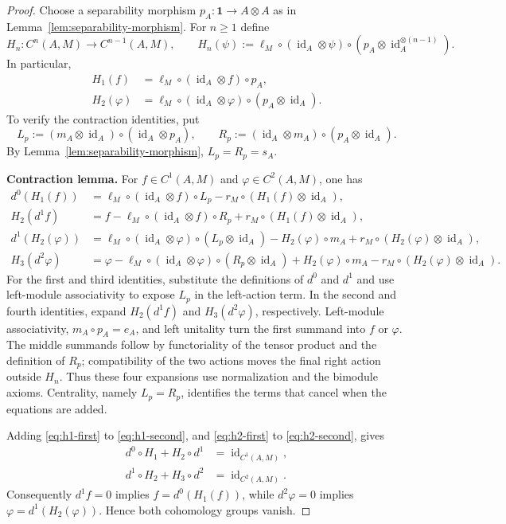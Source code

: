 \documentclass[11pt]{amsart}
\theoremstyle{definition}
\theoremstyle{remark}
\newcommand{\one}{\mathbf 1}
\DeclareMathOperator{\id}{id}
\begin{document}
\begin{proof}
Choose a separability morphism $p_A:\one\to A\otimes A$ as in
Lemma~\ref{lem:separability-morphism}.  For $n\geq1$ define
\begin{equation}\label{eq:categorical-contraction}
 H_n:C^n(A,M)\longrightarrow C^{n-1}(A,M),\qquad
 H_n(\psi):=\ell_M\circ(\id_A\otimes\psi)
 \circ(p_A\otimes\id_A^{\otimes(n-1)}).
\end{equation}
In particular,
\begin{align}
 H_1(f)&=\ell_M\circ(\id_A\otimes f)\circ p_A,
 \label{eq:h1-contraction}\\
 H_2(\varphi)&=\ell_M\circ(\id_A\otimes\varphi)
 \circ(p_A\otimes\id_A).
 \label{eq:h2-contraction}
\end{align}
To verify the contraction identities, put
\[
 L_p:=(m_A\otimes\id_A)\circ(\id_A\otimes p_A),\qquad
 R_p:=(\id_A\otimes m_A)\circ(p_A\otimes\id_A).
\]
By Lemma~\ref{lem:separability-morphism}, $L_p=R_p=s_A$.

\medskip
\noindent\textbf{Contraction lemma.}
For $f\in C^1(A,M)$ and $\varphi\in C^2(A,M)$, one has
\begin{align}
 d^0(H_1(f))
 &=\ell_M\circ(\id_A\otimes f)\circ L_p
   -r_M\circ(H_1(f)\otimes\id_A),\label{eq:h1-first}\\
 H_2(d^1f)
 &=f-\ell_M\circ(\id_A\otimes f)\circ R_p
   +r_M\circ(H_1(f)\otimes\id_A),\label{eq:h1-second}\\
 d^1(H_2(\varphi))
 &=\ell_M\circ(\id_A\otimes\varphi)
     \circ(L_p\otimes\id_A)
   -H_2(\varphi)\circ m_A
   +r_M\circ(H_2(\varphi)\otimes\id_A),\label{eq:h2-first}\\
 H_3(d^2\varphi)
 &=\varphi-\ell_M\circ(\id_A\otimes\varphi)
     \circ(R_p\otimes\id_A)
   +H_2(\varphi)\circ m_A
   -r_M\circ(H_2(\varphi)\otimes\id_A).
 \label{eq:h2-second}
\end{align}
For the first and third identities, substitute the definitions of $d^0$
and $d^1$ and use left-module associativity to expose $L_p$ in the
left-action term.  In the second and fourth identities, expand
$H_2(d^1f)$ and $H_3(d^2\varphi)$, respectively.  Left-module
associativity, $m_A\circ p_A=e_A$, and left unitality turn the first
summand into $f$ or $\varphi$.  The middle summands follow by
functoriality of the tensor product and the definition of $R_p$;
compatibility of the two actions moves the final right action outside
$H_n$.  Thus these four expansions use normalization and the bimodule
axioms.  Centrality, namely $L_p=R_p$, identifies the terms that cancel
when the equations are added.

Adding \eqref{eq:h1-first} to \eqref{eq:h1-second}, and
\eqref{eq:h2-first} to \eqref{eq:h2-second}, gives
\begin{align}
 d^0\circ H_1+H_2\circ d^1&=\id_{C^1(A,M)},
 \label{eq:homotopy-one}\\
 d^1\circ H_2+H_3\circ d^2&=\id_{C^2(A,M)}.
 \label{eq:homotopy-two}
\end{align}
Consequently $d^1f=0$ implies $f=d^0(H_1(f))$, while
$d^2\varphi=0$ implies $\varphi=d^1(H_2(\varphi))$.  Hence both
cohomology groups vanish.
\end{proof}
\end{document}
